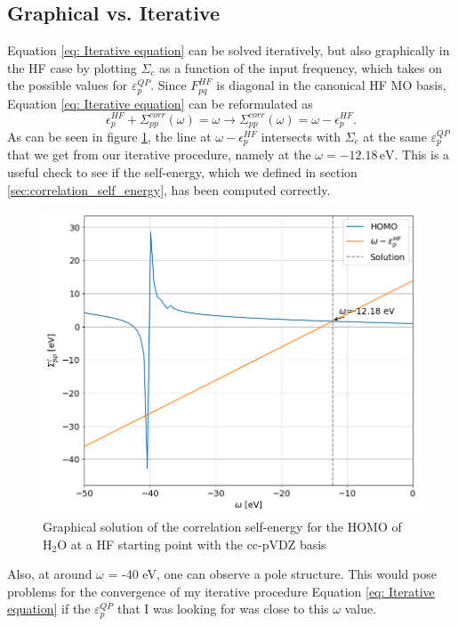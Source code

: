\documentclass[12pt]{caltech_thesis}
\begin{document}
\subsection{Graphical vs. Iterative}
Equation \ref{eq: Iterative equation} can be solved iteratively, but also graphically in the HF case by plotting $\Sigma _{c}$ as a function of the input frequency, which takes on  the possible values for $\varepsilon_{p}^{QP}$. Since $F_{pq}^{HF}$ is diagonal in the canonical HF MO basis, Equation \ref{eq: Iterative equation} can be reformulated as
\begin{equation}
    \epsilon _{p}^{HF} + \Sigma_{pp}^{corr}(\omega) = \omega  \rightarrow \Sigma_{pp}^{corr}(\omega) = \omega  - \epsilon _{p}^{HF}.
\end{equation}
As can be seen in figure \ref{fig:graphic}, the line at $\omega - \epsilon_{p}^{HF}$ intersects with $\Sigma _{c}$ at the same $\varepsilon_{p}^{QP}$ that we get from our iterative procedure, namely at the $\omega = -12.18 \, \mathrm{eV}$.
 This is a useful check to see if the self-energy, which we defined in section \ref{sec:correlation_self_energy}, has been computed correctly.
\begin{figure}[h]
    \centering
    \includegraphics[width=\textwidth]{correlation_energies.png}
\caption{Graphical solution of the correlation self-energy for the HOMO of $\mathrm{H_2O}$ at a HF starting point with the cc-pVDZ basis}
\label{fig:graphic}
\end{figure}
Also, at around $\omega$ = -40 eV, one can observe a pole structure. This would pose problems for the convergence of my iterative procedure Equation \ref{eq: Iterative equation} if the $\varepsilon_{p}^{QP}$ that I was looking for was close to this $\omega $ value. 
\newpage
\end{document}
